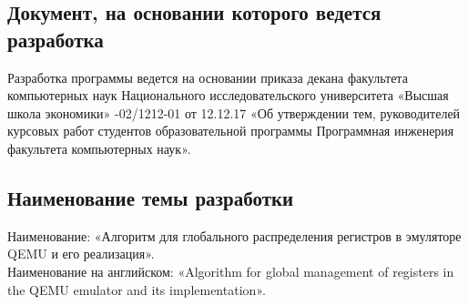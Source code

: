 \subsection{Документ, на основании которого ведется разработка}
Разработка программы ведется на основании приказа декана факультета компьютерных наук  
Национального исследовательского университета «Высшая школа экономики» 
-02/1212-01 от 12.12.17
«Об  утверждении  тем,  руководителей  курсовых  работ  студентов
образовательной  программы  Программная  инженерия 
факультета 
компьютерных наук».


\subsection{Наименование темы разработки}
Наименование: «Алгоритм для глобального распределения регистров в эмуляторе QEMU и его реализация». \\
Наименование на английском: «Algorithm for global management of registers in the QEMU emulator and its implementation». \\